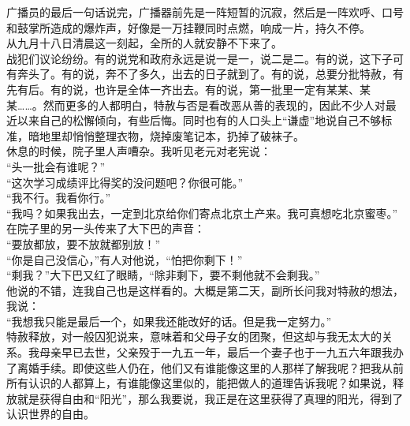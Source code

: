 广播员的最后一句话说完，广播器前先是一阵短暂的沉寂，然后是一阵欢呼、口号和鼓掌所造成的爆炸声，好像是一万挂鞭同时点燃，响成一片，持久不停。\\

从九月十八日清晨这一刻起，全所的人就安静不下来了。\\

战犯们议论纷纷。有的说党和政府永远是说一是一，说二是二。有的说，这下子可有奔头了。有的说，奔不了多久，出去的日子就到了。有的说，总要分批特赦，有先有后。有的说，也许是全体一齐出去。有的说，第一批里一定有某某、某某……。然而更多的人都明白，特赦与否是看改恶从善的表现的，因此不少人对最近以来自己的松懈倾向，有些后悔。同时也有的人口头上“谦虚”地说自己不够标准，暗地里却悄悄整理衣物，烧掉废笔记本，扔掉了破袜子。\\

休息的时候，院子里人声嘈杂。我听见老元对老宪说：\\

“头一批会有谁呢？”\\

“这次学习成绩评比得奖的没问题吧？你很可能。”\\

“我不行。我看你行。”\\

“我吗？如果我出去，一定到北京给你们寄点北京土产来。我可真想吃北京蜜枣。”\\

在院子里的另一头传来了大下巴的声音：\\

“要放都放，要不放就都别放！”\\

“你是自己没信心，”有人对他说，“怕把你剩下！”\\

“剩我？”大下巴又红了眼睛，“除非剩下，要不剩他就不会剩我。”\\

他说的不错，连我自己也是这样看的。大概是第二天，副所长问我对特赦的想法，我说：\\

“我想我只能是最后一个，如果我还能改好的话。但是我一定努力。”\\

特赦释放，对一般囚犯说来，意味着和父母子女的团聚，但这却与我无太大的关系。我母亲早已去世，父亲殁于一九五一年，最后一个妻子也于一九五六年跟我办了离婚手续。即使这些人仍在，他们又有谁能像这里的人那样了解我呢？把我从前所有认识的人都算上，有谁能像这里似的，能把做人的道理告诉我呢？如果说，释放就是获得自由和“阳光”，那么我要说，我正是在这里获得了真理的阳光，得到了认识世界的自由。\\

